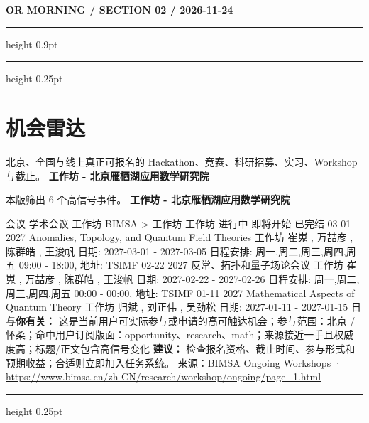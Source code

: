 \documentclass[10.5pt]{ctexart}
\begin{document}
\newpage
{\small\bfseries OR MORNING / SECTION 02 / 2026-11-24}
\vspace{2mm}
\hrule height 0.9pt
\vspace{1.5mm}
\hrule height 0.25pt
\vspace{4mm}
\section*{机会雷达}
{\color{ormuted} 北京、全国与线上真正可报名的 Hackathon、竞赛、科研招募、实习、Workshop 与截止。}
\vspace{2mm}
{\LARGE\bfseries 工作坊 - 北京雁栖湖应用数学研究院}\par
\vspace{1mm}
{\color{ormuted} 本版筛出 6 个高信号事件。}
\vspace{3mm}
{\Large\bfseries 工作坊 - 北京雁栖湖应用数学研究院}\par
会议 学术会议 工作坊 BIMSA > 工作坊 工作坊 进行中 即将开始 已完结 03-01 2027 Anomalies, Topology, and Quantum Field Theories 工作坊 崔嵬 , 万喆彦 , 陈群皓 , 王浚帆 日期: 2027-03-01 - 2027-03-05 日程安排: 周一,周二,周三,周四,周五 09:00 - 18:00, 地址: TSIMF 02-22 2027 反常、拓扑和量子场论会议 工作坊 崔嵬 , 万喆彦 , 陈群皓 , 王浚帆 日期: 2027-02-22 - 2027-02-26 日程安排: 周一,周二,周三,周四,周五 00:00 - 00:00, 地址: TSIMF 01-11 2027 Mathematical Aspects of Quantum Theory 工作坊 归斌 , 刘正伟 , 吴劲松 日期: 2027-01-11 - 2027-01-15 日
\textbf{与你有关：} 这是当前用户可实际参与或申请的高可触达机会；参与范围：北京 / 怀柔；命中用户订阅版面：opportunity、research、math；来源接近一手且权威度高；标题/正文包含高信号变化
\textbf{建议：} 检查报名资格、截止时间、参与形式和预期收益；合适则立即加入任务系统。
{\footnotesize\color{ormuted} 来源：BIMSA Ongoing Workshops · \url{https://www.bimsa.cn/zh-CN/research/workshop/ongoing/page_1.html}}
\vspace{4mm}
\hrule height 0.25pt
\vspace{3mm}
\end{document}
